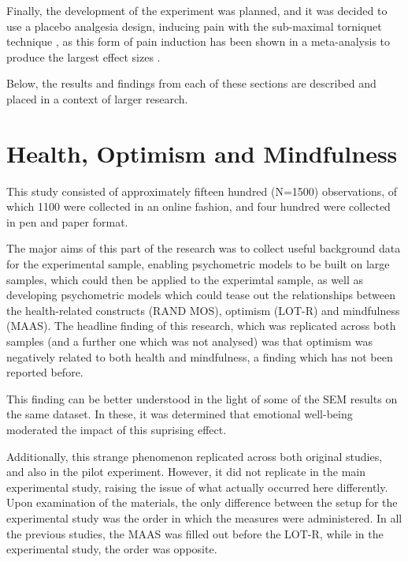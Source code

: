 Finally, the development of the experiment was planned, and it was decided to use a placebo analgesia design, inducing pain with the sub-maximal torniquet technique \cite{moore1979submaximal}, as this form of pain induction has been shown in a meta-analysis to produce the largest effect sizes \cite{Sauro2005}. 

Below, the results and findings from each of these sections are described and placed in a context of larger research. 

\section{Health, Optimism and Mindfulness}
\label{sec:health-optim-mindf}

This study consisted of approximately fifteen hundred (N=1500) observations, of which 1100 were collected in an online fashion, and four hundred were collected in pen and paper format. 

The major aims of this part of the research was to collect useful background data for the experimental sample, enabling psychometric models to be built on large samples, which could then be applied to the experimtal sample, as well as developing psychometric models which could tease out the relationships between the health-related constructs (RAND MOS), optimism (LOT-R) and mindfulness (MAAS). The headline finding of this research, which was replicated across both samples (and a further one which was not analysed) was that optimism was negatively related to both health and mindfulness, a finding which has not been reported before. 

This finding can be better understood in the light of some of the SEM results on the same dataset. In these, it was determined that emotional well-being moderated the impact of this suprising effect. 


Additionally, this strange phenomenon replicated across both original studies, and also in the pilot experiment. However, it did not replicate in the main experimental study, raising the issue of what actually occurred here differently. Upon examination of the materials, the only difference between the setup for the experimental study was the order in which the measures were administered. In all the previous studies, the MAAS was filled out before the LOT-R, while in the experimental study, the order was opposite. 

